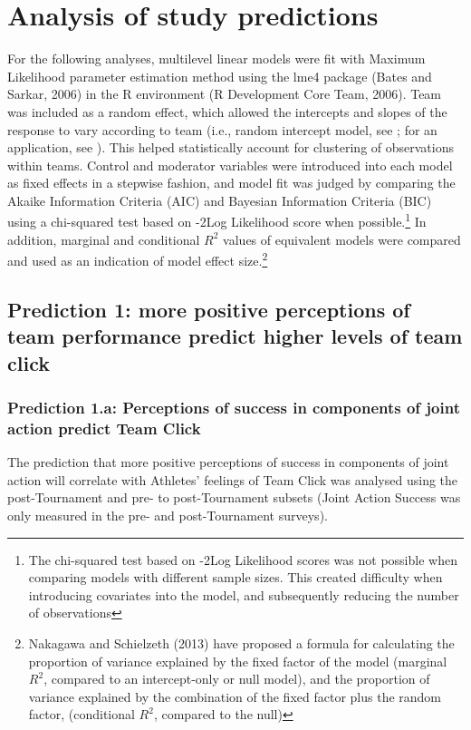 \section{Analysis of study predictions}
For the following analyses, multilevel linear models were fit with Maximum Likelihood parameter estimation method using the lme4 package (Bates and Sarkar, 2006) in the R environment (R Development Core Team, 2006).  Team was included as a random effect, which allowed the intercepts and slopes of the response to vary according to team (i.e., random intercept model, see \citep{Pinheiro2000}; for an application, see \citep{Oberauer2006}). This helped statistically account for clustering of observations within teams. Control and moderator variables were introduced into each model as fixed effects in a stepwise fashion, and model fit was judged by comparing the Akaike Information Criteria (AIC) and Bayesian Information Criteria (BIC) using a chi-squared test based on -2Log Likelihood score when possible.\footnote{The chi-squared test based on -2Log Likelihood scores was not possible when comparing models with different sample sizes.
This created difficulty when introducing covariates into the model, and subsequently reducing the number of observations} In addition, marginal and conditional $R^2$ values of equivalent models were compared and used as an indication of model effect size.\footnote{Nakagawa and Schielzeth (2013) have proposed a formula for calculating the proportion of variance explained by the fixed factor of the model (marginal $R^2$, compared to an intercept-only or null model), and the proportion of variance explained by the combination of the fixed factor plus the random factor, (conditional $R^2$, compared to the null)}

\subsection{Prediction 1: more positive perceptions of team performance predict higher levels of team click}

\subsubsection{Prediction 1.a: Perceptions of success in components of joint action predict Team Click}

The prediction that more positive perceptions of success in components of joint action will correlate with Athletes' feelings of Team Click was analysed using the post-Tournament and pre- to post-Tournament subsets (Joint Action Success was only measured in the pre- and post-Tournament surveys).

